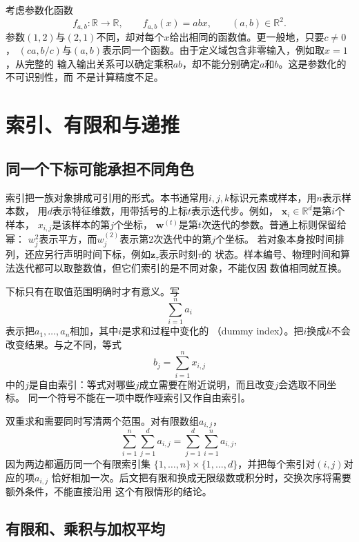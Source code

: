 \begin{example}[参数不同而函数相同]
\label{ex:prelim-nonidentifiable-parameterization}
考虑参数化函数
\[
  f_{a,b}:\mathbb{R}\to\mathbb{R},
  \qquad
  f_{a,b}(x)=abx,
  \qquad
  (a,b)\in\mathbb{R}^2.
\]
参数$(1,2)$与$(2,1)$不同，却对每个$x$给出相同的函数值。更一般地，只要$c\neq0$，
$(ca,b/c)$与$(a,b)$表示同一个函数。由于定义域包含非零输入，例如取$x=1$，从完整的
输入输出关系可以确定乘积$ab$，却不能分别确定$a$和$b$。这是参数化的不可识别性，而
不是计算精度不足。
\end{example}

\section{索引、有限和与递推}
\label{sec:prelim-indices-sums-recurrences}

\subsection{同一个下标可能承担不同角色}

索引把一族对象排成可引用的形式。本书通常用$i,j,k$标识元素或样本，用$n$表示样本数，
用$d$表示特征维数，用带括号的上标$t$表示迭代步。例如，
$\bm{x}_i\in\mathbb{R}^d$是第$i$个样本，
$x_{i,j}$是该样本的第$j$个坐标，
$\bm{w}^{(t)}$是第$t$次迭代的参数。普通上标则保留给幂：
$w_j^2$表示平方，而$w_j^{(2)}$表示第$2$次迭代中的第$j$个坐标。
若对象本身按时间排列，还应另行声明时间下标，例如$\bm{z}_{\tau}$表示时刻$\tau$的
状态。样本编号、物理时间和算法迭代都可以取整数值，但它们索引的是不同对象，不能仅因
数值相同就互换。

下标只有在取值范围明确时才有意义。写
\[
  \sum_{i=1}^{n}a_i
\]
表示把$a_1,\ldots,a_n$相加，其中$i$是求和过程中变化的
（dummy index）。把$i$换成$k$不会改变结果。与之不同，等式
\[
  b_j=\sum_{i=1}^{n}x_{i,j}
\]
中的$j$是自由索引：等式对哪些$j$成立需要在附近说明，而且改变$j$会选取不同坐标。
同一个符号不能在一项中既作哑索引又作自由索引。

双重求和需要同时写清两个范围。对有限数组$a_{i,j}$，
\[
  \sum_{i=1}^{n}\sum_{j=1}^{d}a_{i,j}
  =
  \sum_{j=1}^{d}\sum_{i=1}^{n}a_{i,j},
\]
因为两边都遍历同一个有限索引集
$\{1,\ldots,n\}\times\{1,\ldots,d\}$，并把每个索引对$(i,j)$对应的项$a_{i,j}$
恰好相加一次。后文把有限和换成无限级数或积分时，交换次序将需要额外条件，不能直接沿用
这个有限情形的结论。

\subsection{有限和、乘积与加权平均}

